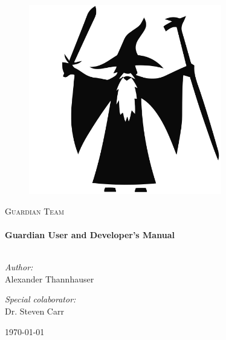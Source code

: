 
\begin{titlepage}
{
	\begin{center}
	{
		\begin{figure}
			\centering
			\includegraphics[width=0.75\textwidth]{./img/you-shall-not-pass}\\[1cm]
		\end{figure}
		
		\textsc{\LARGE Guardian Team}\\[1.5cm]
		
		\HRule \\[0.4cm]
		{ \huge \bfseries Guardian User and Developer's Manual}\\[0.4cm]
		\HRule \\[1.5cm]
		
		\begin{minipage}{0.4\textwidth}
		\begin{flushleft} \large
		\emph{Author:}\\
		Alexander Thannhauser
		\end{flushleft}
		\end{minipage}
		\begin{minipage}{0.4\textwidth}
		\begin{flushright} \large
		\emph{Special colaborator:} \\
		Dr. Steven Carr
		\end{flushright}
		\end{minipage}
		
		\vfill
		{\large \today}
	}
	\end{center}
}
\end{titlepage}
